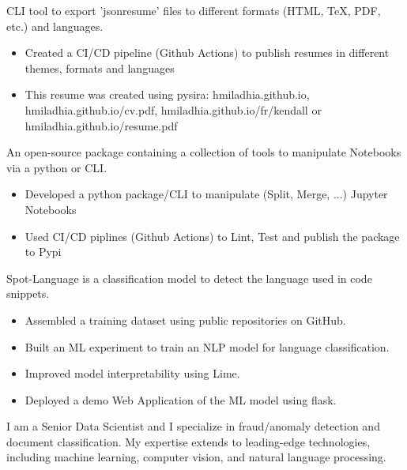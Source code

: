 \documentclass[10pt,letter,ragged2e,withhyper]{altacv}
\renewcommand{\divider}{\textcolor{body!30}{\hdashrule{\linewidth}{0.6pt}{0.5ex}}\medskip}
\begin{document}
\begin{paracol}{2}
CLI tool to export 'jsonresume' files to different formats (HTML, TeX, PDF, etc.) and languages.

\begin{itemize}
      \item Created a CI/CD pipeline (Github Actions) to publish resumes in different themes, formats and languages
      \item This resume was created using pysira: hmiladhia.github.io, hmiladhia.github.io/cv.pdf, hmiladhia.github.io/fr/kendall or hmiladhia.github.io/resume.pdf
  \end{itemize}

\divider
{}

An open-source package containing a collection of tools to manipulate Notebooks via a python or CLI.

\begin{itemize}
      \item Developed a python package/CLI to manipulate (Split, Merge, ...) Jupyter Notebooks
      \item Used CI/CD piplines (Github Actions) to Lint, Test and publish the package to Pypi
  \end{itemize}

\divider
{}

Spot-Language is a classification model to detect the language used in code snippets.

\begin{itemize}
      \item Assembled a training dataset using public repositories on GitHub.
      \item Built an ML experiment to train an NLP model for language classification.
      \item Improved model interpretability using Lime.
      \item Deployed a demo Web Application of the ML model using flask.
  \end{itemize}



\switchcolumn
{}
{\small
I am a Senior Data Scientist and I specialize in fraud/anomaly detection and document classification.
My expertise extends to leading-edge technologies, including machine learning, computer vision, and natural language processing.

}
\end{paracol}
\end{document}
